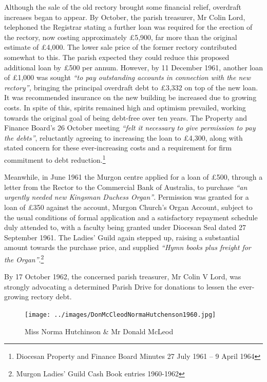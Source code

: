 Although the sale of the old rectory brought some financial relief, overdraft increases began to appear. By October, the parish treasurer, Mr Colin Lord, telephoned the Registrar stating a further loan was required for the erection of the rectory, now costing approximately \pounds5,900, far more than the original estimate of \pounds4,000. The lower sale price of the former rectory contributed somewhat to this. The parish expected they could reduce this proposed additional loan by \pounds500 per annum. However, by 11 December 1961, another loan of \pounds1,000 was sought \emph{``to pay outstanding accounts in connection with the new rectory'',} bringing the principal overdraft debt to \pounds3,332 on top of the new loan. It was recommended insurance on the new building be increased due to growing costs. In spite of this, spirits remained high and optimism prevailed, working towards the original goal of being debt-free over ten years. The Property and Finance Board's 26 October meeting \emph{``felt it necessary to give permission to pay the debts''}, reluctantly agreeing to increasing the loan to \pounds4,300, along with stated concern for these ever-increasing costs and a requirement for firm commitment to debt reduction.\footnote{Diocesan Property and Finance Board Minutes 27 July 1961 -- 9 April 1964}


Meanwhile, in June 1961 the Murgon centre applied for a loan of \pounds500, through a letter from the Rector to the Commercial Bank of Australia, to purchase \emph{``an urgently needed new Kingsman Duchess Organ''}. Permission was granted for a loan of \pounds350 against the account, Murgon Church's Organ Account, subject to the usual conditions of formal application and a satisfactory repayment schedule duly attended to, with a faculty being granted under Diocesan Seal dated 27 September 1961. The Ladies' Guild again stepped up, raising a substantial amount towards the purchase price, and supplied \emph{``Hymn books plus freight for the Organ''}.\footnote{Murgon Ladies' Guild Cash Book entries 1960-1962}


By 17 October 1962, the concerned parish treasurer, Mr Colin V Lord, was strongly advocating a determined Parish Drive for donations to lessen the ever-growing rectory debt.









\begin{figure}[!htb]
\begin{center}
\texttt{[image: ../images/DonMcCleodNormaHutchenson1960.jpg]}
\caption{Miss Norma Hutchinson \& Mr Donald McLeod}
\end{center}
\end{figure}




